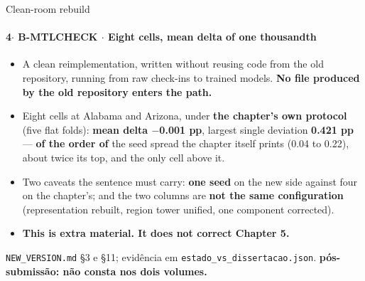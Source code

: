 \documentclass{beamer}
\begin{document}
\begin{frame}[noframenumbering]{Clean-room rebuild}
    \framesubtitle{\normalsize 4$\cdot$ \textbf{B-MTLCHECK} $\cdot$ Eight cells, mean delta of one thousandth}
    \hypertarget{bmtlcheck}{}
    \small
    \begin{itemize}\setlength{\itemsep}{0pt}\setlength{\parskip}{0pt}
        \item A clean reimplementation, written without reusing code from the old repository, running from raw check-ins to trained models. \textbf{No file produced by the old repository enters the path.}
        \item Eight cells at Alabama and Arizona, under \textbf{the chapter's own protocol} (five flat folds): \textbf{mean delta $-$0.001 pp}, largest single deviation \textbf{0.421 pp} --- \textbf{of the order of} the seed spread the chapter itself prints (0.04 to 0.22), about twice its top, and the only cell above it.
        \item Two caveats the sentence must carry: \textbf{one seed} on the new side against four on the chapter's; and the two columns are \textbf{not the same configuration} (representation rebuilt, region tower unified, one component corrected).
        \item \textcolor{alert}{\textbf{This is extra material. It does not correct Chapter 5.}}
    \end{itemize}
    \vfill
    {\scriptsize
    \begin{minipage}[b]{0.775\linewidth}\raggedright\textcolor{black!70}{\texttt{NEW\_VERSION.md} §3 e §11; evidência em \texttt{estado\_vs\_dissertacao.json}. \textbf{pós-submissão: não consta nos dois volumes.}}\end{minipage}\hfill
    \begin{minipage}[b]{0.20\linewidth}\raggedleft \hyperlink{b0}{}\end{minipage}}
\end{frame}
\end{document}
